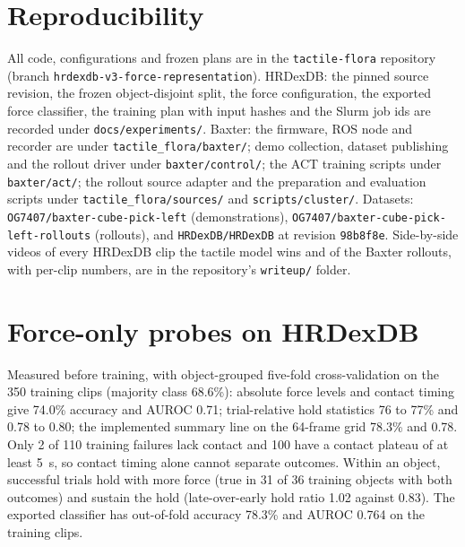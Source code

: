 \documentclass{article}
\begin{document}
\appendix

\section{Reproducibility}

All code, configurations and frozen plans are in the \texttt{tactile-flora} repository (branch
\texttt{hrdexdb-v3-force-representation}). HRDexDB: the pinned source revision, the frozen
object-disjoint split, the force configuration, the exported force classifier, the training plan
with input hashes and the Slurm job ids are recorded under \texttt{docs/experiments/}. Baxter:
the firmware, ROS node and recorder are under \texttt{tactile\_flora/baxter/}; demo collection,
dataset publishing and the rollout driver under \texttt{baxter/control/}; the ACT training scripts
under \texttt{baxter/act/}; the rollout source adapter and the preparation and evaluation
scripts under \texttt{tactile\_flora/sources/} and \texttt{scripts/cluster/}. Datasets:
\texttt{OG7407/baxter-cube-pick-left} (demonstrations), \texttt{OG7407/baxter-cube-pick-left-rollouts}
(rollouts), and \texttt{HRDexDB/HRDexDB} at revision \texttt{98b8f8e}. Side-by-side videos of
every HRDexDB clip the tactile model wins and of the Baxter rollouts, with per-clip numbers, are in
the repository's \texttt{writeup/} folder.

\section{Force-only probes on HRDexDB}

Measured before training, with object-grouped five-fold cross-validation on the 350 training
clips (majority class 68.6\%): absolute force levels and contact timing give 74.0\% accuracy and
AUROC 0.71; trial-relative hold statistics 76 to 77\% and 0.78 to 0.80; the implemented summary
line on the 64-frame grid 78.3\% and 0.78. Only 2 of 110 training failures lack contact and 100
have a contact plateau of at least 5~s, so contact timing alone cannot separate outcomes. Within
an object, successful trials hold with more force (true in 31 of 36 training objects with both
outcomes) and sustain the hold (late-over-early hold ratio 1.02 against 0.83). The exported
classifier has out-of-fold accuracy 78.3\% and AUROC 0.764 on the training clips.
\end{document}
